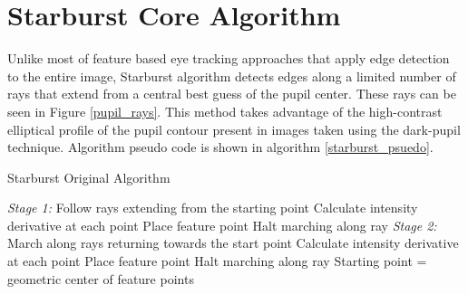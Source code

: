 \section{Starburst Core Algorithm}

Unlike most of feature based eye tracking approaches that apply edge detection to the entire image, Starburst algorithm detects edges along a limited number of rays that extend from a central best guess of the pupil center. These rays can be seen in Figure \ref{pupil_rays}. This method takes advantage of the high-contrast elliptical profile of the pupil contour present in images taken using the dark-pupil technique. Algorithm pseudo code is shown in algorithm \ref{starburst_psuedo}. \bigskip


\begin{algorithm}
\begin{dBox}
	\caption{Starburst Original Algorithm} \label{starburst_psuedo}
	\begin{algorithmic}[1]
			\Repeat  
				\vspace{1em}	
				\State \emph{Stage 1:}
					\State Follow rays extending from the starting point
					\State Calculate intensity derivative at each point
						\State Place feature point
						\State Halt marching along ray
					\EndIf		
				\vspace{1em}	
				\State \emph{Stage 2:}
						\State March along rays returning towards the start point
						\State Calculate intensity derivative at each point
							\State Place feature point
							\State Halt marching along ray
						\EndIf		
					\EndFor
					\vspace{.3em}			
					\State Starting point = geometric center of feature points
			\vspace{1em}							
		\EndProcedure	
	\end{algorithmic}
\end{dBox}	
\end{algorithm}

